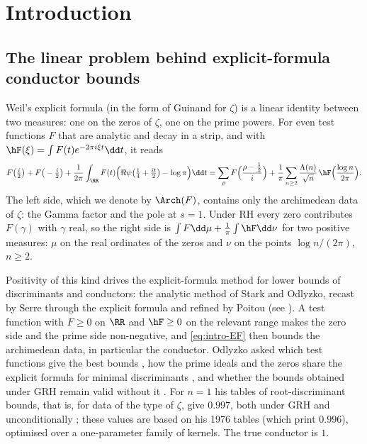 \section{Introduction}

\subsection{The linear problem behind explicit-formula conductor bounds}

Weil's explicit formula \cite{Wei52} (in the form of Guinand \cite{Gui48} for $\zeta$) is a linear identity between two
measures: one on the zeros of $\zeta$, one on the prime powers. For even test functions $F$ that are analytic and decay in a
strip, and with $\hF(\xi)=\int F(t)e^{-2\pi i\xi t}\dd t$, it reads
\begin{equation}\label{eq:intro-EF}
F\big(\tfrac i2\big)+F\big(-\tfrac i2\big)+\frac1{2\pi}\int_\RR F(t)\Big(\Re\psi\big(\tfrac14+\tfrac{it}2\big)-\log\pi\Big)\dd t
=\sum_\rho F\Big(\frac{\rho-\frac12}i\Big)+\frac1\pi\sum_{n\ge2}\frac{\Lambda(n)}{\sqrt n}\,\hF\Big(\frac{\log n}{2\pi}\Big).
\end{equation}
The left side, which we denote by $\Arch(F)$, contains only the archimedean data of $\zeta$: the Gamma factor and the pole at
$s=1$. Under RH every zero contributes $F(\gamma)$ with $\gamma$ real, so the right side is $\int F\dd\mu+\frac1\pi\int\hF\dd\nu$ for two
positive measures: $\mu$ on the real ordinates of the zeros and $\nu$ on the points $\log n/(2\pi)$, $n\ge2$.

Positivity of this kind drives the explicit-formula method for lower bounds of discriminants and conductors: the analytic method of
Stark and Odlyzko, recast by Serre through the explicit formula and refined by Poitou \cite{Sta74,Odl76,Odl77,Ser75,Poi77,Poi77b} (see
\cite[pp.~120--121]{Odl90}). A test function with $F\ge0$ on $\RR$ and $\hF\ge0$ on the relevant range makes
the zero side and the prime side non-negative, and \eqref{eq:intro-EF} then bounds the archimedean data, in particular the
conductor. Odlyzko asked which test functions give the best bounds \cite[Open Problem~2.2, p.~123]{Odl90}, how the prime ideals and the
zeros share the explicit formula for minimal discriminants \cite[Open Problem~6.1 and Table~5]{Odl90}, and whether the bounds
obtained under GRH remain valid without it \cite[Open Problem~6.3, p.~132]{Odl90}. For $n=1$ his tables of root-discriminant
bounds, that is, for data of the type of $\zeta$, give $0.997$, both under GRH and unconditionally \cite[Table~4, p.~134]{Odl90};
these values are based on his 1976 tables \cite{Odl76} (which print $0.996$), optimised over a one-parameter family of kernels. The true conductor is $1$.

